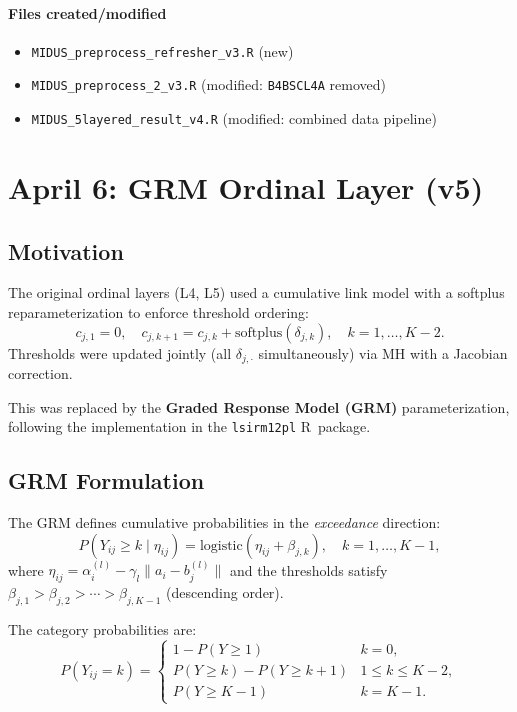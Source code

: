 \documentclass[11pt]{article}
\begin{document}
\paragraph{Files created/modified}
\begin{itemize}[leftmargin=1.5em]
  \item \texttt{MIDUS\_preprocess\_refresher\_v3.R} (new)
  \item \texttt{MIDUS\_preprocess\_2\_v3.R} (modified: \texttt{B4BSCL4A} removed)
  \item \texttt{MIDUS\_5layered\_result\_v4.R} (modified: combined data pipeline)
\end{itemize}


\section{April 6: GRM Ordinal Layer (v5)}

\subsection{Motivation}

The original ordinal layers (L4, L5) used a cumulative link model with a softplus reparameterization to enforce threshold ordering:
\[
  c_{j,1} = 0, \quad c_{j,k+1} = c_{j,k} + \text{softplus}(\delta_{j,k}), \quad k=1,\dots,K-2.
\]
Thresholds were updated jointly (all $\delta_{j,\cdot}$ simultaneously) via MH with a Jacobian correction.

This was replaced by the \textbf{Graded Response Model (GRM)} parameterization, following the implementation in the \texttt{lsirm12pl} R~package.

\subsection{GRM Formulation}

The GRM defines cumulative probabilities in the \emph{exceedance} direction:
\[
  P(Y_{ij} \ge k \mid \eta_{ij}) = \text{logistic}(\eta_{ij} + \beta_{j,k}), \quad k=1,\dots,K-1,
\]
where $\eta_{ij} = \alpha_i^{(l)} - \gamma_l \|a_i - b_j^{(l)}\|$ and the thresholds satisfy $\beta_{j,1} > \beta_{j,2} > \cdots > \beta_{j,K-1}$ (descending order).

The category probabilities are:
\[
  P(Y_{ij}=k) = \begin{cases}
    1 - P(Y \ge 1) & k=0, \\
    P(Y \ge k) - P(Y \ge k+1) & 1 \le k \le K-2, \\
    P(Y \ge K-1) & k=K-1.
  \end{cases}
\]
\end{document}
